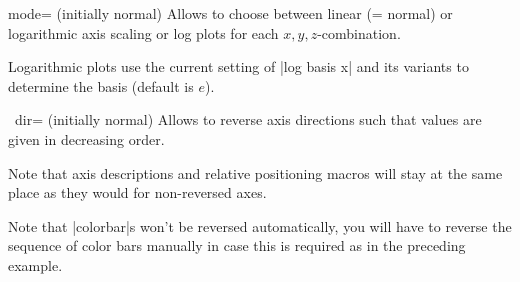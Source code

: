 \begin{pgfplotsxykey}{\x mode= (initially normal)}
    Allows to choose between linear (= normal) or logarithmic axis scaling or
    log plots for each $x,y,z$-combination.

    Logarithmic plots use the current setting of |log basis x| and its variants
    to determine the basis (default is $e$).
\end{pgfplotsxykey}

\begin{pgfplotsxykey}{\x\ dir= (initially normal)}
\label{key:pgfplots:xydir}%
    Allows to reverse axis directions such that values are given in decreasing
    order.
\begin{codeexample}[]
\end{codeexample}

\begin{codeexample}[]
\end{codeexample}

    Note that axis descriptions and relative positioning macros will stay at
    the same place as they would for non-reversed axes.
\begin{codeexample}[]
\end{codeexample}

    Note that |colorbar|s won't be reversed automatically, you will have to
    reverse the sequence of color bars manually in case this is required as in
    the preceding example.
\end{pgfplotsxykey}


